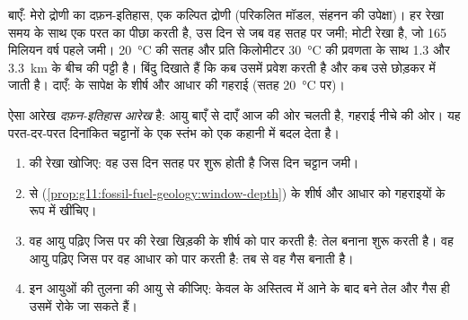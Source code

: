 \begin{omfigure}
{\small बाएँ: मेरो द्रोणी का दफ़न-इतिहास, एक कल्पित द्रोणी (परिकलित
मॉडल, संहनन की उपेक्षा)। हर रेखा समय के साथ एक परत का पीछा करती है,
उस दिन से जब वह सतह पर जमी; मोटी रेखा  है,
जो 165 मिलियन वर्ष पहले जमी। \qty{20}{\degreeCelsius} की सतह
और प्रति किलोमीटर \qty{30}{\degreeCelsius} की प्रवणता के साथ
 \num{1.3} और
\qty{3.3}{km} के बीच की पट्टी है। बिंदु दिखाते हैं कि  कब उसमें प्रवेश करती है और कब
उसे छोड़कर  में जाती है। दाएँ:  के सापेक्ष  के
शीर्ष और आधार की गहराई (सतह
\qty{20}{\degreeCelsius} पर)।}
\end{omfigure}

ऐसा आरेख \emph{दफ़न-इतिहास आरेख} है: आयु बाएँ से
दाएँ आज की ओर चलती है, गहराई नीचे की ओर। यह परत-दर-परत दिनांकित चट्टानों के
एक स्तंभ को एक कहानी में बदल देता है।

\begin{method}[दफ़न-इतिहास आरेख पढ़ना]\label{met:g11:fossil-fuel-geology:burial}
\begin{enumerate}
  \item {} की रेखा खोजिए: वह उस दिन सतह पर शुरू होती है
        जिस दिन चट्टान जमी।
  \item {} से (\cref{prop:g11:fossil-fuel-geology:window-depth})
         के शीर्ष और आधार को गहराइयों के रूप में खींचिए।
  \item वह आयु पढ़िए जिस पर  की रेखा खिड़की के शीर्ष को
        पार करती है:  तेल बनाना शुरू करती है। वह आयु पढ़िए जिस पर वह
        आधार को पार करती है: तब से वह गैस बनाती है।
  \item इन आयुओं की तुलना  की आयु से कीजिए: केवल  के अस्तित्व में आने के बाद
        बने तेल और गैस ही उसमें रोके जा सकते हैं।
\end{enumerate}
\end{method}

